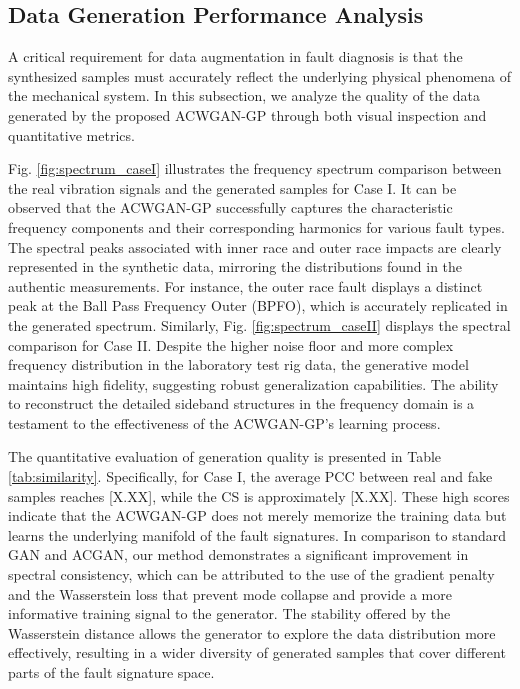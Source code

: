 \subsection{Data Generation Performance Analysis}
A critical requirement for data augmentation in fault diagnosis is that the synthesized samples must accurately reflect the underlying physical phenomena of the mechanical system. In this subsection, we analyze the quality of the data generated by the proposed ACWGAN-GP through both visual inspection and quantitative metrics.

Fig. \ref{fig:spectrum_caseI} illustrates the frequency spectrum comparison between the real vibration signals and the generated samples for Case I. It can be observed that the ACWGAN-GP successfully captures the characteristic frequency components and their corresponding harmonics for various fault types. The spectral peaks associated with inner race and outer race impacts are clearly represented in the synthetic data, mirroring the distributions found in the authentic measurements. For instance, the outer race fault displays a distinct peak at the Ball Pass Frequency Outer (BPFO), which is accurately replicated in the generated spectrum. Similarly, Fig. \ref{fig:spectrum_caseII} displays the spectral comparison for Case II. Despite the higher noise floor and more complex frequency distribution in the laboratory test rig data, the generative model maintains high fidelity, suggesting robust generalization capabilities. The ability to reconstruct the detailed sideband structures in the frequency domain is a testament to the effectiveness of the ACWGAN-GP's learning process.

The quantitative evaluation of generation quality is presented in Table \ref{tab:similarity}. Specifically, for Case I, the average PCC between real and fake samples reaches [X.XX], while the CS is approximately [X.XX]. These high scores indicate that the ACWGAN-GP does not merely memorize the training data but learns the underlying manifold of the fault signatures. In comparison to standard GAN and ACGAN, our method demonstrates a significant improvement in spectral consistency, which can be attributed to the use of the gradient penalty and the Wasserstein loss that prevent mode collapse and provide a more informative training signal to the generator. The stability offered by the Wasserstein distance allows the generator to explore the data distribution more effectively, resulting in a wider diversity of generated samples that cover different parts of the fault signature space.

